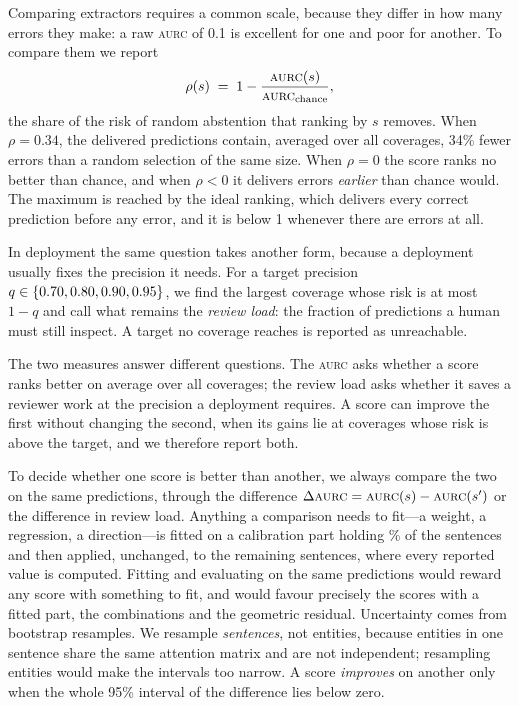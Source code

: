 \documentclass[11pt,a4paper]{article}
\newcommand{\aurc}{\textsc{aurc}}
\begin{document}
Comparing extractors requires a common scale, because they differ in how many errors they make: a raw \aurc{} of
0.1 is excellent for one and poor for another. To compare them we report
\begin{equation}
  \rho(s) \;=\; 1-\frac{\aurc(s)}{\aurc_{\text{chance}}},
  \label{eq:rho}
\end{equation}
the share of the risk of random abstention that ranking by $s$ removes. When $\rho=0.34$, the delivered predictions
contain, averaged over all coverages, 34\% fewer errors than a random selection of the same size. When $\rho=0$ the
score ranks no better than chance, and when $\rho<0$ it delivers errors \emph{earlier} than chance would. The maximum
is reached by the ideal ranking, which delivers every correct prediction before any error, and it is below 1 whenever
there are errors at all.

In deployment the same question takes another form, because a deployment usually fixes the precision it needs. For a target
precision $q\in\{0.70, 0.80, 0.90, 0.95\}$, we find the largest coverage whose risk is at most $1-q$ and call what remains the
\emph{review load}: the fraction of predictions a human must still inspect. A target no coverage reaches is reported as
unreachable.

The two measures answer different questions. The \aurc{} asks whether a score ranks better on average over all coverages;
the review load asks whether it saves a reviewer work at the precision a deployment requires. A score can improve the first
without changing the second, when its gains lie at coverages whose risk is above the target, and we therefore report both.

To decide whether one score is better than another, we always compare the two on the same predictions,
through the difference $\Delta\aurc=\aurc(s)-\aurc(s')$ or the difference in review load. Anything a comparison needs to
fit---a weight, a regression, a direction---is fitted on a calibration part holding \declCalFrac\% of the sentences and
then applied, unchanged, to the remaining sentences, where every reported value is computed. Fitting and evaluating on the same predictions would reward any score with something to fit, and would favour precisely the scores with a fitted part, the combinations and the geometric residual. Uncertainty comes from
\declResamples{} bootstrap resamples. We resample \emph{sentences}, not entities, because entities in one sentence share
the same attention matrix and are not independent; resampling entities would make the intervals too narrow. A score
\emph{improves} on another only when the whole 95\% interval of the difference lies below zero.
\end{document}
